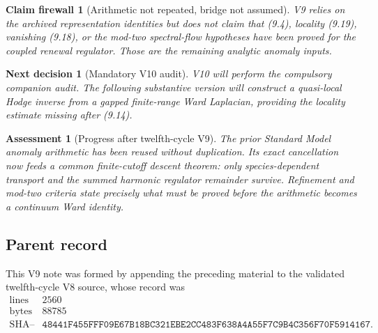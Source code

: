 \documentclass[11pt]{article}
\newtheorem{firewall}[theorem]{Claim firewall}
\newtheorem{decision}[theorem]{Next decision}
\newtheorem{assessment}[theorem]{Assessment}
\theoremstyle{remark}
\begin{document}
\begin{firewall}[Arithmetic not repeated, bridge not assumed]
\label{fire:v12v9-boundary}
V9 relies on the archived representation identities but does not
claim that (9.4), locality (9.19), vanishing (9.18), or the mod-two
spectral-flow hypotheses have been proved for the coupled renewal
regulator.  Those are the remaining analytic anomaly inputs.
\end{firewall}

\begin{decision}[Mandatory V10 audit]
\label{dec:v12v9-next}
V10 will perform the compulsory companion audit.  The following
substantive version will construct a quasi-local Hodge inverse from a
gapped finite-range Ward Laplacian, providing the locality estimate
missing after (9.14).
\end{decision}

\begin{assessment}[Progress after twelfth-cycle V9]
\label{ass:v12v9-status}
The prior Standard Model anomaly arithmetic has been reused without
duplication.  Its exact cancellation now feeds a common finite-cutoff
descent theorem: only species-dependent transport and the summed
harmonic regulator remainder survive.  Refinement and mod-two
criteria state precisely what must be proved before the arithmetic
becomes a continuum Ward identity.
\end{assessment}

\subsection{Parent record}

This V9 note was formed by appending the preceding material to the
validated twelfth-cycle V8 source, whose record was
\[
\begin{array}{c|c}
\text{lines}&2560\\
\text{bytes}&88785\\
\text{SHA--256}&
\texttt{48441F455FFF09E67B18BC321EBE2CC483F638A4A55F7C9B4C356F70F5914167}.
\end{array}                                                     \tag{9.21}
\]

\end{document}
